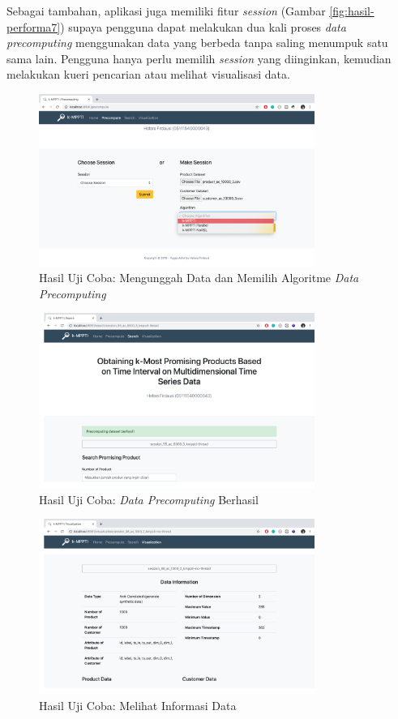 Sebagai tambahan, aplikasi juga memiliki fitur \textit{session} (Gambar \ref{fig:hasil-performa7}) supaya pengguna dapat melakukan dua kali proses \textit{data precomputing} menggunakan data yang berbeda tanpa saling menumpuk satu sama lain. Pengguna hanya perlu memilih \textit{session} yang diinginkan, kemudian melakukan kueri pencarian atau melihat visualisasi data. \\

\begin{figure}[H]
	\centering
	\includegraphics[width=9cm]{assets/img/bab5/hasil2.png}
	\caption{Hasil Uji Coba: Mengunggah Data dan Memilih Algoritme \textit{Data Precomputing}}
	\label{fig:hasil-performa1}
\end{figure}

\begin{figure}[H]
	\centering
	\includegraphics[width=9cm]{assets/img/bab5/hasil1.png}
	\caption{Hasil Uji Coba: \textit{Data Precomputing} Berhasil}
	\label{fig:hasil-performa2}
\end{figure}

\begin{figure}[H]
	\centering
	\includegraphics[width=9cm]{assets/img/bab5/hasil3.png}
	\caption{Hasil Uji Coba: Melihat Informasi Data}
	\label{fig:hasil-performa3}
\end{figure}

